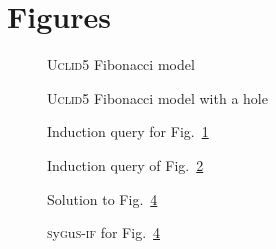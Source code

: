 \documentclass[acmsmall]{acmart}
\newcommand{\uclid}{{\textsc{Uclid5}}\xspace}
\newcommand{\sygusif}{{\textsc{s}y\textsc{g}u\textsc{s-if}}\xspace}
\begin{document}
\clearpage
\section{Figures}
\begin{figure}[h]
  
  \caption{\uclid Fibonacci model}
  \label{ex:fib}
\end{figure}
\begin{figure}[h]
  
  \caption{\uclid Fibonacci model with a hole}
  \label{ex:fib-hole}
\end{figure}
\begin{figure}[h]
    
    \caption{Induction query for Fig.~\ref{ex:fib}}
    \label{ex:fib-smt}
\end{figure}
\begin{figure}[h]
    
    \caption{Induction query of Fig.~\ref{ex:fib-hole}}
    \label{ex:fib-synth}
\end{figure}
\begin{figure}[h]
    
    \caption{Solution to Fig.~\ref{ex:fib-synth}}
    \label{ex:fib-sol}
\end{figure}
\begin{figure}[h]
    
    \caption{\sygusif for Fig.~\ref{ex:fib-synth}}
    \label{ex:fib-sygusif}
\end{figure}
\end{document}
